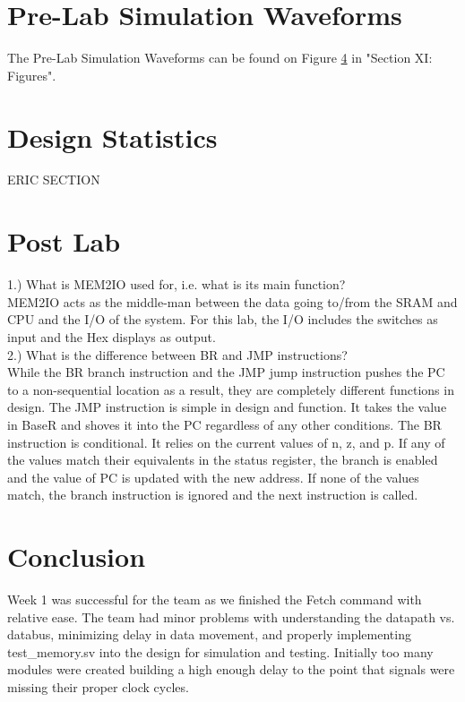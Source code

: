 \documentclass[journal, twocolumn, final,11pt,letterpaper]{IEEEtran}
\begin{document}
\section{Pre-Lab Simulation Waveforms}
The Pre-Lab Simulation Waveforms can be found on Figure \ref{} in "Section XI: Figures".

\section{Design Statistics}
ERIC SECTION

\section{Post Lab}



1.) What is MEM2IO used for, i.e. what is its main function? \\

MEM2IO acts as the middle-man between the data going to/from the SRAM and CPU and the I/O of the system.  For this lab, the I/O includes the switches as input and the Hex displays as output. \\  

2.) What is the difference between BR and JMP instructions?\\

While the BR branch instruction and the JMP jump instruction pushes the PC to a non-sequential location as a result, they are completely different functions in design.  The JMP instruction is simple in design and function.  It takes the value in BaseR and shoves it into the PC regardless of any other conditions.  The BR instruction is conditional.  It relies on the current values of n, z, and p.  If any of the values match their equivalents in the status register, the branch is enabled and the value of PC is updated with the new address.  If none of the values match, the branch instruction is ignored and the next instruction is called.  \\    

\section{Conclusion}
Week 1 was successful for the team as we finished the Fetch command with relative ease.  The team had minor problems with understanding the datapath vs. databus, minimizing delay in data movement, and properly implementing test\_memory.sv into the design for simulation and testing.  Initially too many modules were created building a high enough delay to the point that signals were missing their proper clock cycles.  \\
\end{document}
